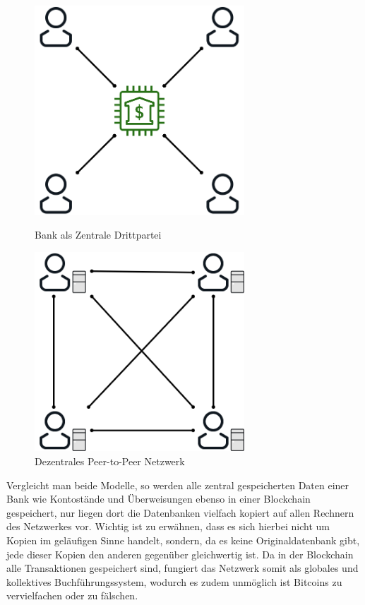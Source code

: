 \documentclass[12pt,oneside]{article}
\begin{document}
\begin{figure}[h]
    \centering
    \begin{minipage}{0.37\textwidth}
        \centering
        \includegraphics[width=0.7\textwidth]{./images/central.png} %
        \caption{Bank als Zentrale Drittpartei}
    \end{minipage}
    \begin{minipage}{0.37\textwidth}
        \centering
        \includegraphics[width=0.7\textwidth]{./images/decentral.png} %
        \caption{Dezentrales Peer-to-Peer Netzwerk}
    \end{minipage}
\end{figure}

Vergleicht man beide Modelle, so werden alle zentral gespeicherten Daten einer Bank wie Kontostände und Überweisungen ebenso in einer Blockchain gespeichert, nur liegen dort die Datenbanken vielfach kopiert auf allen Rechnern des Netzwerkes vor. Wichtig ist zu erwähnen, dass es sich hierbei nicht um Kopien im geläufigen Sinne handelt, sondern, da es keine Originaldatenbank gibt, jede dieser Kopien den anderen gegenüber gleichwertig ist. Da in der Blockchain alle Transaktionen gespeichert sind, fungiert das Netzwerk somit als globales und kollektives Buchführungssystem, wodurch es zudem unmöglich ist Bitcoins zu vervielfachen oder zu fälschen.
\cite{rosenberg2019}
\end{document}
